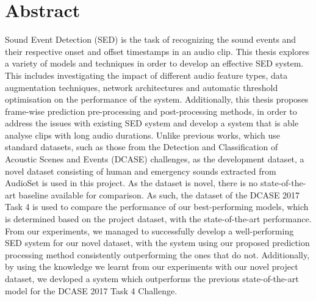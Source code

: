 
\linespread{1.3}
\chapter*{Abstract}
\large{}

Sound Event Detection (SED) is the task of recognizing the sound events and their respective onset and offset timestamps in an audio clip. This thesis explores a variety of models and techniques in order to develop an effective SED system. This includes investigating the impact of different audio feature types, data augmentation techniques, network architectures and automatic threshold optimisation on the performance of the system. Additionally, this thesis proposes frame-wise prediction pre-processing and post-processing methods, in order to address the issues with existing SED system and develop a system that is able analyse clips with long audio durations. Unlike previous works, which use standard datasets, such as those from the Detection and Classification of Acoustic Scenes and Events (DCASE) challenges, as the development dataset, a novel dataset consisting of human and emergency sounds extracted from AudioSet is used in this project. As the dataset is novel, there is no state-of-the-art baseline available for comparison. As such, the dataset of the DCASE 2017 Task 4 is used to compare the performance of our best-performing models, which is determined based on the project dataset, with the state-of-the-art performance. From our experiments, we managed to successfully develop a well-performing SED system for our novel dataset, with the system using our proposed prediction processing method consistently outperforming the ones that do not. Additionally, by using the knowledge we learnt from our experiments with our novel project dataset, we devloped a system which outperforms the previous state-of-the-art model for the DCASE 2017 Task 4 Challenge.


